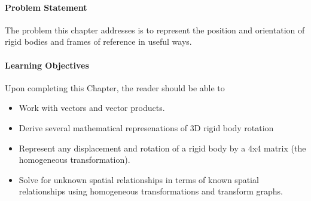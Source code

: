 \paragraph{Problem Statement}
 The problem this chapter addresses is to represent the position and orientation of rigid bodies and frames of reference in useful ways. 

\paragraph{Learning Objectives}
Upon completing this Chapter, the reader should be able to 
\begin{itemize}
	\item  Work with vectors and vector products.
	\item  Derive several mathematical represenations of 3D rigid body rotation
	\item  Represent any displacement and rotation of a rigid body by a 4x4 matrix (the homogeneous transformation).
        \item  Solve for unknown spatial relationships in terms of known spatial relationships using homogeneous transformations and transform graphs. 
\end{itemize}
